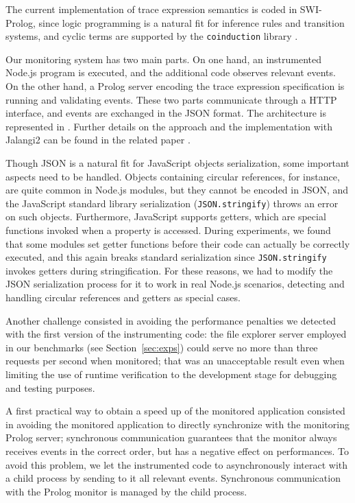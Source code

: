 The current implementation of trace expression semantics is coded in SWI-Prolog, since logic programming is a natural fit for inference rules and transition systems, and cyclic terms are supported by the \texttt{coinduction} library \cite{CoLP06}.

Our monitoring system has two main parts.
On one hand, an instrumented Node.js program is executed, and the additional code observes relevant events.
On the other hand, a Prolog server encoding the trace expression specification is running and validating events.
These two parts communicate through a HTTP interface, and events are exchanged in the JSON format.
The architecture is represented in .
Further details on the approach and the implementation with Jalangi2 can be found in the related paper \cite{TowardsIoT17}.

Though JSON is a natural fit for JavaScript objects serialization, some important aspects need to be handled.
Objects containing circular references, for instance, are quite common in Node.js modules, but they cannot be encoded in JSON, and the JavaScript standard library serialization (\lstinline|JSON.stringify|) throws an error on such objects.
Furthermore, JavaScript supports getters, which are special functions invoked when a property is accessed.
During experiments, we found that some modules set getter functions before their code can actually be correctly executed, and this again breaks standard serialization since \lstinline|JSON.stringify| invokes getters during stringification.
For these reasons, we had to modify the JSON serialization process for it to work in real Node.js scenarios, detecting and handling circular references and getters as special cases.

Another challenge consisted in avoiding the performance penalties we detected with the first version of the
instrumenting code: the file explorer server employed in our benchmarks (see Section~\ref{sec:exps}) could serve no more than
three requests per second when monitored; that was an unacceptable result even when limiting
the use of runtime verification to the development stage for debugging and testing purposes.

A first practical way to obtain a speed up of the monitored application consisted in
avoiding the monitored application to directly synchronize with the monitoring Prolog server;
synchronous communication guarantees that the monitor always receives events in the correct order,
but has a negative effect on performances. To avoid this problem, we let the instrumented code
to asynchronously interact with a child process by sending to it all relevant events. Synchronous
communication with the Prolog  monitor is managed by the child process.


